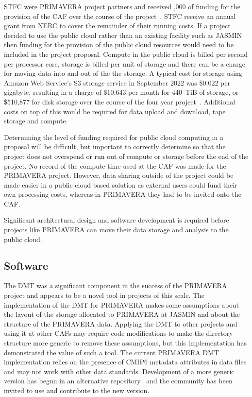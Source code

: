 \documentclass[gmd, manuscript]{copernicus}
\begin{document}
STFC were PRIMAVERA project partners and received ,000 of funding for the provision of the CAF over the course of the project~\citep{Bennett2020}. STFC receive an annual grant from NERC to cover the remainder of their running costs. If a project decided to use the public cloud rather than an existing facility such as JASMIN then funding for the provision of the public cloud resources would need to be included in the project proposal. Compute in the public cloud is billed per second per processor core, storage is billed per unit of storage and there can be a charge for moving data into and out of the the storage. A typical cost for storage using Amazon Web Service's S3 storage service in September 2022 was \$0.022 per gigabyte, resulting in a charge of \$10,643 per month for 440~TiB of storage, or \$510,877 for disk storage over the course of the four year project~\citep{aws_calculator}. Additional costs on top of this would be required for data upload and download, tape storage and compute.

Determining the level of funding required for public cloud computing in a proposal will be difficult, but important to correctly determine so that the project does not overspend or run out of compute or storage before the end of the project. No record of the compute time used at the CAF was made for the PRIMAVERA project. However, data sharing outside of the project could be made easier in a public cloud based solution as external users could fund their own processing costs, whereas in PRIMAVERA they had to be invited onto the CAF.

Significant architectural design and software development is required before projects like PRIMAVERA can move their data storage and analysis to the public cloud.

\subsection{Software}

The DMT was a significant component in the success of the PRIMAVERA project and appears to be a novel tool in projects of this scale. The implementation of the DMT for PRIMAVERA makes some assumptions about the layout of the storage allocated to PRIMAVERA at JASMIN and about the structure of the PRIMAVERA data. Applying the DMT to other projects and using it at other CAFs may require code modifications to make the directory structure more generic to remove these assumptions, but this implementation has demonstrated the value of such a tool. The current PRIMAVERA DMT implementation relies on the presence of CMIP6 metadata attributes in data files and may not work with other data standards. Development of a more generic version has begun in an alternative repository~\citep{generic_dmt} and the community has been invited to use and contribute to the new version.
\end{document}
